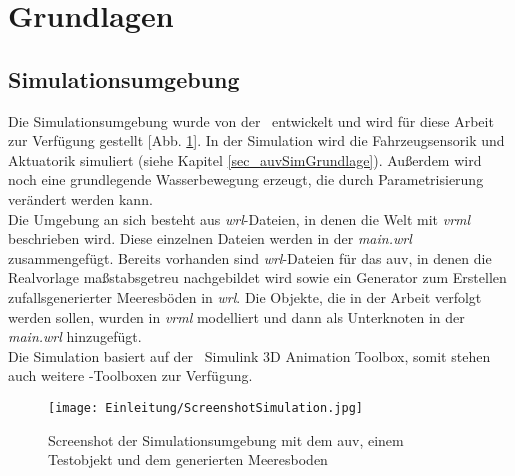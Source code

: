 \section{Grundlagen}
\subsection{Simulationsumgebung}
Die Simulationsumgebung wurde von der \atlas\ entwickelt und wird für diese Arbeit zur Verfügung gestellt [Abb. \ref{screenSim}].
In der Simulation wird die Fahrzeugsensorik und Aktuatorik simuliert (siehe Kapitel \ref{sec_auvSimGrundlage}). Außerdem wird noch eine grundlegende Wasserbewegung erzeugt, die durch Parametrisierung verändert werden kann.\\

Die Umgebung an sich besteht aus \textit{wrl}-Dateien, in denen die Welt mit \textit{\gls{vrml}} beschrieben wird. Diese einzelnen Dateien werden in der \textit{main.wrl} zusammengefügt. Bereits vorhanden sind \textit{wrl}-Dateien für das \gls{auv}, in denen die Realvorlage maßstabsgetreu nachgebildet wird sowie ein Generator zum Erstellen zufallsgenerierter Meeresböden in \textit{wrl}. Die Objekte, die in der Arbeit verfolgt werden sollen, wurden in \textit{\gls{vrml}} modelliert und dann als Unterknoten in der \textit{main.wrl} hinzugefügt.\\
Die Simulation basiert auf der \matlab\ Simulink 3D Animation Toolbox, somit stehen auch weitere \matlab -Toolboxen zur Verfügung. 
\begin{figure}[H]
\texttt{[image: Einleitung/ScreenshotSimulation.jpg]}
\caption[Screenshot der Simulationsumgebung]{Screenshot der Simulationsumgebung mit dem \gls{auv}, einem Testobjekt und dem generierten Meeresboden}
\label{screenSim}
\end{figure}
